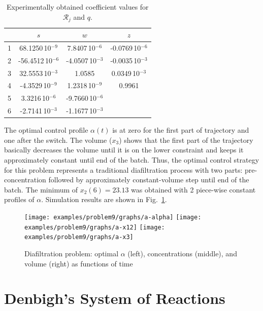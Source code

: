 \begin{table}
  \caption{Experimentally obtained coefficient values for $\mathcal{R}_j$ and $q$.}
  \label{tab:coefficients}
  \centering
  \begin{tabular}{lccc}
    & $s$ & $w$ & $z$ \\ \hline
1  &68.1250\,10$^{-9}$ &7.8407\,10$^{-6}$ &  -0.0769\,10$^{-6}$\\
2  &-56.4512\,10$^{-6}$ &-4.0507\,10$^{-3}$ & -0.0035\,10$^{-3}$ \\
3  & 32.5553\,10$^{-3}$& 1.0585&  0.0349\,10$^{-3}$\\
4  & -4.3529\,10$^{-9}$& 1.2318\,10$^{-9}$& 0.9961 \\
5  & 3.3216\,10$^{-6}$& -9.7660\,10$^{-6}$&  \\
6  & -2.7141\,10$^{-3}$& -1.1677\,10$^{-3}$&  \\
  \end{tabular}
\end{table}

The optimal control profile $\alpha(t)$ is at zero for the first part
of trajectory and one after the switch.  The volume ($x_3$) shows that
the first part of the trajectory basically decreases the volume until
it is on the lower constraint and keeps it approximately constant
until end of the batch. Thus, the optimal control strategy for this
problem represents a traditional diafiltration process with two parts:
pre-concentration followed by approximately constant-volume step until
end of the batch.  The minimum of $x_2(6) = 23.13$ was obtained with
2 piece-wise constant profiles of $\alpha$. Simulation results are
shown in Fig.~\ref{fig:problem-a}.

\begin{figure}[!h]
  \centering
  \texttt{[image: examples/problem9/graphs/a-alpha]}
  \texttt{[image: examples/problem9/graphs/a-x12]} 
  \texttt{[image: examples/problem9/graphs/a-x3]}
  \caption{Diafiltration problem: optimal $\alpha$ (left),
    concentrations (middle), and volume (right) as functions of time}
  \label{fig:problem-a}
\end{figure}

\section{Denbigh's System of Reactions}
\label{sec:brpdae}

